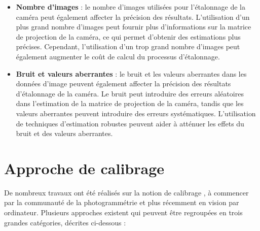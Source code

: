 \begin{itemize}
  	\item \textbf{Nombre d'images} :  le nombre d’images utilisées pour l’étalonnage de la caméra peut également affecter la précision des résultats. L’utilisation d’un plus grand nombre d’images peut fournir plus d’informations sur la matrice de projection de la caméra, ce qui permet d’obtenir des estimations plus précises. Cependant, l’utilisation d’un trop grand nombre d’images peut également augmenter le coût de calcul du processus d’étalonnage. \\
  	
  	\item \textbf{Bruit et valeurs aberrantes} :  le bruit et les valeurs aberrantes dans les données d’image peuvent également affecter la précision des résultats d’étalonnage de la caméra. Le bruit peut introduire des erreurs aléatoires dans l’estimation de la matrice de projection de la caméra, tandis que les valeurs aberrantes peuvent introduire des erreurs systématiques. L’utilisation de techniques d’estimation robustes peuvent aider à atténuer les effets du bruit et des valeurs aberrantes.
  \end{itemize}
   
  
  
  
  
  
  
  
  
  
  
  \newpage
  
  \section{Approche de calibrage}
  
  De nombreux travaux ont été réalisés sur la notion de calibrage , à commencer par la communauté de la photogrammétrie et plus récemment en vision par ordinateur.
  Plusieurs approches existent qui peuvent être regroupées en trois grandes catégories, décrites ci-dessous : 
  
